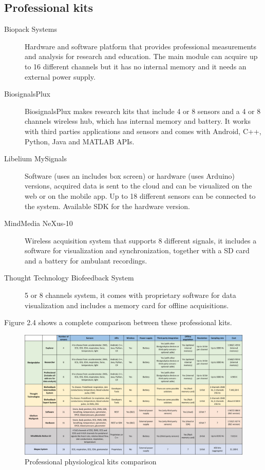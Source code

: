 \documentclass[binding=0.6cm,LaM]{sapthesis}
\begin{document}
\subsection{Professional kits}

\begin{description}

\item[Biopack Systems]
Hardware and software platform that provides professional measurements and analysis for research and education. The main module can acquire up to 16 different channels but it has no internal memory and it needs an external power supply.

\item[BiosignalsPlux]
BiosignalsPlux makes research kits that include 4 or 8 sensors and a 4 or 8 channels wireless hub, which has internal memory and battery. It works with third parties applications and sensors and comes with  Android, C++, Python, Java and MATLAB APIs.

\item[Libelium MySignals]
Software (uses an includes box screen) or hardware (uses Arduino) versions, acquired data is sent to the cloud and can be visualized on the web or on the mobile app. Up to 18 different sensors can be connected to the system. Available SDK for the hardware version.

\item[MindMedia NeXus-10]
Wireless acquisition system that supports 8 different signals, it includes a software for visualization and synchronization, together with a SD card and a battery for ambulant recordings.

\item[Thought Technology Biofeedback System]
5 or 8 channels system, it comes with proprietary software for data visualization and includes a memory card for offline acquisitions.

\end{description}

Figure 2.4 shows a complete comparison between these professional kits.

\begin{figure}
\centering
\includegraphics[scale=.9, angle=90]{images/table2}
\caption{Professional physiological kits comparison}
\end{figure}
\end{document}
